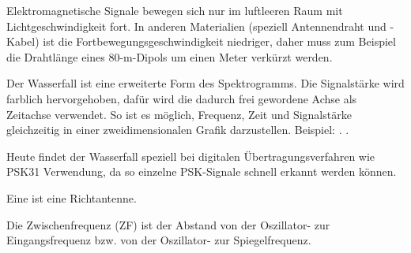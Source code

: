 {}

{Elektromagnetische Signale bewegen sich nur im luftleeren Raum mit Lichtgeschwindigkeit fort. In anderen Materialien (speziell Antennendraht und -Kabel) ist die Fortbewegungsgeschwindigkeit niedriger, daher muss zum Beispiel die Drahtlänge eines 80-m-Dipols um einen Meter verkürzt werden.
}

{}

{Der Wasserfall ist eine erweiterte Form des Spektrogramms. Die Signalstärke wird farblich hervorgehoben, dafür wird die dadurch frei gewordene Achse als Zeitachse verwendet. So ist es möglich, Frequenz, Zeit und Signalstärke gleichzeitig in einer zweidimensionalen Grafik darzustellen.  Beispiel: . .

Heute findet der Wasserfall speziell bei digitalen Übertragungsverfahren wie PSK31 Verwendung, da so einzelne PSK-Signale schnell erkannt werden können.}

{Eine  ist eine Richtantenne.}

{Die Zwischenfrequenz (ZF) ist der Abstand von der Oszillator- zur Eingangsfrequenz bzw. von der Oszillator- zur Spiegel­fre­quenz.}